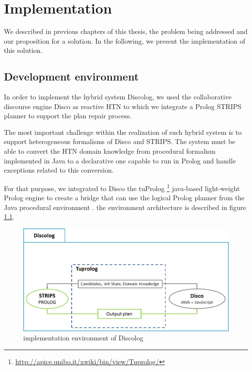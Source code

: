 
\chapter{Implementation} %

\label{Chapter 5} %

We described in previous chapters of this thesis, the  problem  being addressed and our proposition for a solution. In the following, we present the implementation of this solution. 

\section{Development environment }
In order to implement the hybrid system Discolog, we used the collaborative discourse engine Disco \cite{rich2009building} as reactive HTN to which we integrate a Prolog STRIPS planner  to support the plan repair process. 

The most important challenge within the realization of such hybrid system is to support heterogeneous formalisms of Disco and STRIPS. The system must be able to convert  the HTN domain knowledge from procedural formalism implemented in Java to a declarative one capable to run in Prolog  and  handle exceptions related to this conversion. 

For that purpose, we integrated to Disco the tuProlog \footnote{\url{http://apice.unibo.it/xwiki/bin/view/Tuprolog/}}  java-based light-weight Prolog engine to create a bridge that can use the logical Prolog planner from the Java procedural environment . the environment architecture is described  in figure \ref{implementation environment of Discolog}.
\begin{figure}[h]
	\centering
	\includegraphics[width=\textwidth]{Pictures/archi1.png}
	\caption{\label{implementation environment of Discolog} implementation environment of Discolog}
\end{figure}


